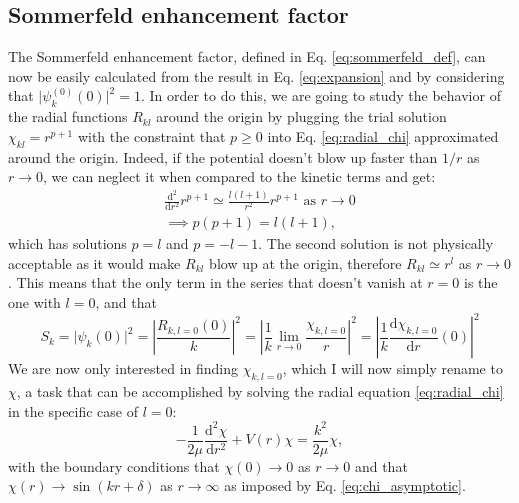 \subsection{Sommerfeld enhancement factor}
The Sommerfeld enhancement factor, defined in Eq. \eqref{eq:sommerfeld_def}, can now be easily calculated from the result in Eq. \eqref{eq:expansion} and by considering that \(\vert \psi_k^{(0)}(0) \vert^2=1 \). In order to do this, we are going to study the behavior of the radial functions \(R_{kl} \) around the origin by plugging the trial solution \(\chi_{kl} = r^{p+1} \) with the constraint that \(p\geq 0\) into Eq. \eqref{eq:radial_chi} approximated around the origin. Indeed, if the potential doesn't blow up faster than \(1 / r\) as \(r \to 0\), we can neglect it when compared to the kinetic terms and get:
\begin{gather}
	\frac{\mathrm{d}^2}{\mathrm{d}r^2} r^{p+1} \simeq \frac{l(l+1)}{r^2}r^{p+1} \text{ as } r \to 0 \\
	\implies p(p+1)=l(l+1),
\end{gather}
which has solutions \(p=l\) and \(p=-l-1\). The second solution is not physically acceptable as it would make \(R_{kl} \) blow up at the origin, therefore \(R_{kl} \simeq r^l \) as \(r \to 0\). This means that the only term in the series that doesn't vanish at \(r=0\) is the one with \(l=0\), and that
\begin{equation}
	S_k=\vert \psi _k (0) \vert ^2 
	= \left\vert \frac{R_{k,l=0}(0)}{k} \right\vert ^2 
	= \left\vert \frac{1}{k}\lim_{r \to 0} \frac{\chi_{k,l=0}}{r} \right\vert ^2
	= \left\vert \frac{1}{k}\frac{\mathrm{d}\chi_{k,l=0}}{\mathrm{d}r} (0) \right\vert ^2
\end{equation}
We are now only interested in finding \(\chi_{k,l=0}\), which I will now simply rename to \(\chi \), a task that can be accomplished by solving the radial equation \eqref{eq:radial_chi} in the specific case of \(l=0\):
\begin{equation}\label{eq:goal_equation}
	-\frac{1}{2\mu } \frac{\mathrm{d}^2 \chi}{\mathrm{d}r^2} + V(r) \chi = \frac{k^2}{2\mu } \chi,
\end{equation}
with the boundary conditions that \(\chi (0) \to  0\) as \(r \to 0\) and that \(\chi (r) \to \sin (kr + \delta)\) as \(r \to \infty \) as imposed by Eq. \eqref{eq:chi_asymptotic}.

